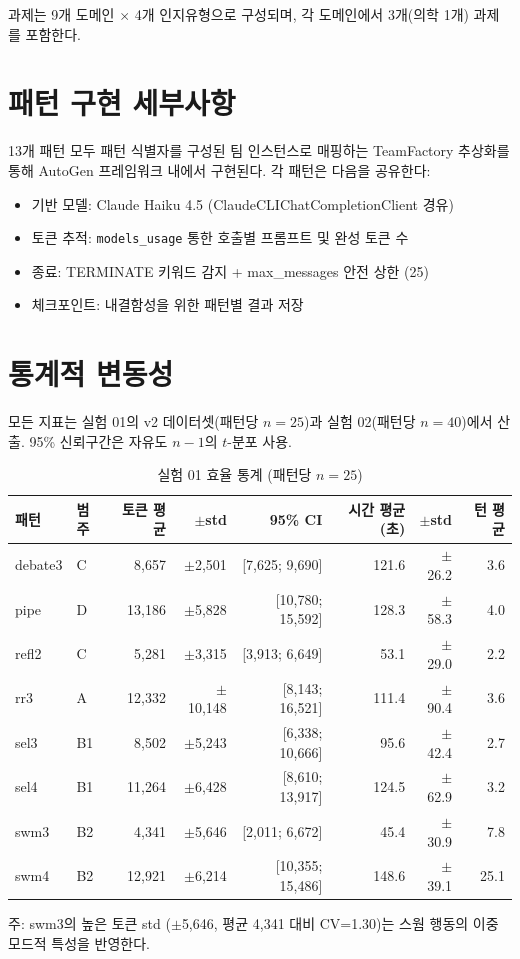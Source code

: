 과제는 9개 도메인 $\times$ 4개 인지유형으로 구성되며, 각 도메인에서 3개(의학 1개) 과제를 포함한다.

\section{패턴 구현 세부사항}
\label{app:pattern-impl}

13개 패턴 모두 패턴 식별자를 구성된 팀 인스턴스로 매핑하는 TeamFactory 추상화를 통해 AutoGen 프레임워크 내에서 구현된다. 각 패턴은 다음을 공유한다:
\begin{itemize}
  \item 기반 모델: Claude Haiku 4.5 (ClaudeCLIChatCompletionClient 경유)
  \item 토큰 추적: \texttt{models\_usage} 통한 호출별 프롬프트 및 완성 토큰 수
  \item 종료: TERMINATE 키워드 감지 + max\_messages 안전 상한 (25)
  \item 체크포인트: 내결함성을 위한 패턴별 결과 저장
\end{itemize}

\section{통계적 변동성}
\label{app:variability}

모든 지표는 실험 01의 v2 데이터셋(패턴당 $n=25$)과 실험 02(패턴당 $n=40$)에서 산출. 95\% 신뢰구간은 자유도 $n-1$의 $t$-분포 사용.

\begin{table}[H]
\centering
\caption{실험 01 효율 통계 (패턴당 $n=25$)}
\label{tab:c1-exp01-stats}
{\footnotesize
\begin{tabular}{llrrrrrr}
\toprule
패턴 & 범주 & 토큰 평균 & $\pm$std & 95\% CI & 시간 평균(초) & $\pm$std & 턴 평균 \\
\midrule
debate3 & C  & 8,657  & $\pm$2,501  & [7,625; 9,690]   & 121.6 & $\pm$26.2  & 3.6 \\
pipe    & D  & 13,186 & $\pm$5,828  & [10,780; 15,592] & 128.3 & $\pm$58.3  & 4.0 \\
refl2   & C  & 5,281  & $\pm$3,315  & [3,913; 6,649]   & 53.1  & $\pm$29.0  & 2.2 \\
rr3     & A  & 12,332 & $\pm$10,148 & [8,143; 16,521]  & 111.4 & $\pm$90.4  & 3.6 \\
sel3    & B1 & 8,502  & $\pm$5,243  & [6,338; 10,666]  & 95.6  & $\pm$42.4  & 2.7 \\
sel4    & B1 & 11,264 & $\pm$6,428  & [8,610; 13,917]  & 124.5 & $\pm$62.9  & 3.2 \\
swm3    & B2 & 4,341  & $\pm$5,646  & [2,011; 6,672]   & 45.4  & $\pm$30.9  & 7.8 \\
swm4    & B2 & 12,921 & $\pm$6,214  & [10,355; 15,486] & 148.6 & $\pm$39.1  & 25.1 \\
\bottomrule
\end{tabular}
}

\smallskip
{\footnotesize 주: swm3의 높은 토큰 std ($\pm$5,646, 평균 4,341 대비 CV=1.30)는 스웜 행동의 이중 모드적 특성을 반영한다.}
\end{table}

